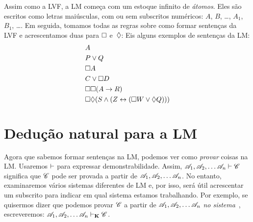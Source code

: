 Assim como a LVF, a LM começa com um estoque infinito de \emph{átomos}. Eles são escritos como letras maiúsculas, com ou sem subscritos numéricos: $A$, $B$, \dots, $A_1$, $B_1$, \dots. Em seguida, tomamos todas as regras sobre como formar sentenças da LVF e acrescentamos duas para $\Box$ e~$\Diamond$:
Eis alguns exemplos de sentenças da LM:
\begin{align*}
	& A\\
	& P\vee Q\\
	& \Box A\\
	& C\vee \Box D\\
	& \Box\Box (A\rightarrow R)\\
	& \Box\Diamond (S\wedge (Z\leftrightarrow (\Box W \vee \Diamond Q)))
\end{align*}

\chapter{Dedução natural para a LM}
\label{Proof}

Agora que sabemos formar sentenças na LM, podemos ver como \emph{provar} coisas na LM. Usaremos $\vdash$ para expressar demonstrabilidade. Assim, $\mathscr{A}_1,\mathscr{A}_2, \dots \mathscr{A}_n \vdash \mathscr{C}$ significa que $\mathscr{C}$ pode ser provada a partir de $\mathscr{A}_1,\mathscr{A}_2, \dots \mathscr{A}_n$. No entanto, examinaremos vários sistemas diferentes de LM e, por isso, será útil acrescentar um subscrito para indicar em qual sistema estamos trabalhando. Por exemplo, se quisermos dizer que podemos provar $\mathscr{C}$ a partir de $\mathscr{A}_1,\mathscr{A}_2, \dots \mathscr{A}_n$ \emph{no sistema}~\mlK, escreveremos: $\mathscr{A}_1,\mathscr{A}_2, \dots \mathscr{A}_n \vdash_{\mathbf{K}} \mathscr{C}$.

